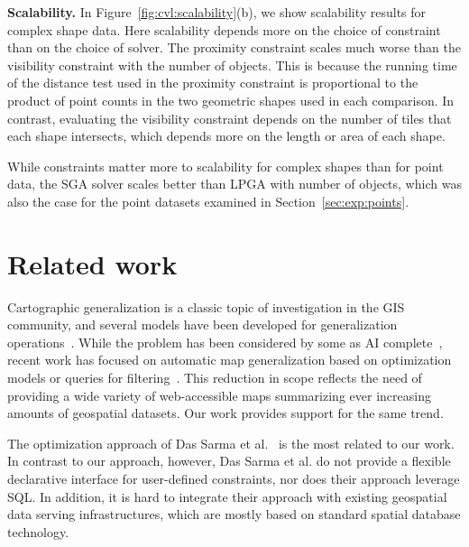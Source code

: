 \documentclass[11pt, oneside]{report}
\newcommand{\minisec}[1]{\noindent\textbf{#1.}}
\begin{document}
{%

\minisec{Scalability}
In Figure~\ref{fig:cvl:scalability}(b), we show scalability results for complex shape data. Here scalability depends more on the choice of constraint than on the choice of solver. The proximity constraint scales much worse than the visibility constraint with the number of objects. This is because the running time of the distance test used in the proximity constraint is proportional to the product of point counts in the two geometric shapes used in each comparison. In contrast, evaluating the visibility constraint depends on the number of tiles that each shape intersects, which depends more on the length or area of each shape. 

While constraints matter more to scalability for complex shapes than for point data, the SGA solver scales better than LPGA with number of objects, which was also the case for the point datasets examined in Section~\ref{sec:exp:points}.

\section{Related work}
\label{sec:cvl:related:work}

Cartographic generalization is a classic topic of investigation in the GIS community, and several models have been developed for generalization operations~\cite{harrie2007modelling}. While the problem has been considered by some as AI complete~\cite{frank1994multiscaletree}, recent work has focused on automatic map generalization based on optimization models or queries for filtering~\cite{sarma2012fusiontables,nutanong2012multiresolution}. This reduction in scope reflects the need of providing a wide variety of web-accessible maps summarizing ever increasing amounts of geospatial datasets. Our work provides support for the same trend.  

The optimization approach of Das Sarma et al.~\cite{sarma2012fusiontables} is the most related to our work. In contrast to our approach, however, Das Sarma et al. do not provide a flexible declarative interface for user-defined constraints, nor does their approach leverage SQL. 
In addition, it is hard to integrate their approach with existing geospatial data serving infrastructures, which are mostly based on standard spatial database technology.

}
\end{document}
